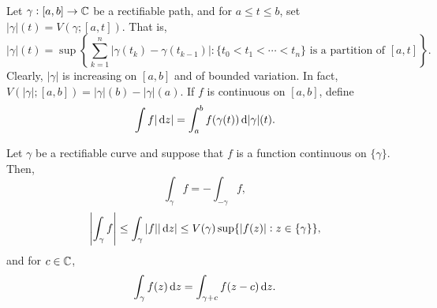 	\begin{definition}
		Let $\gamma : [a,b] \to \mathbb{C}$ be a rectifiable path, and for $a \le t \le b$, set $|\gamma|(t) = V(\gamma;[a,t])$. That is,
		\[ |\gamma|(t) = \sup\left\{ \sum_{k=1}^{n} |\gamma(t_k) - \gamma(t_{k-1})| : \{ t_0 < t_1 < \cdots < t_n \}\text{ is a partition of }[a,t] \right\}. \]
		Clearly, $|\gamma|$ is increasing on $[a,b]$ and of bounded variation. In fact, $V(|\gamma|;[a,b]) = |\gamma|(b) - |\gamma|(a)$. If $f$ is continuous on $[a,b]$, define
		\[ \int f |\dif z| = \int_a^b f(\gamma(t)) \dif |\gamma|(t). \]
	\end{definition}

	\begin{ftheo}
		Let $\gamma$ be a rectifiable curve and suppose that $f$ is a function continuous on $\{\gamma\}$. Then,
		\begin{equation}
			\label{eqn: 2.2}
			\int_\gamma f = - \int_{-\gamma} f,
		\end{equation}
		\begin{equation}
			\label{eqn: 2.3}
			\left| \int_\gamma f \right| \le \int_\gamma |f| |\dif z| \le V(\gamma) \sup\{ |f(z)| : z \in \{\gamma\} \},
		\end{equation}
		and for $c \in \mathbb{C}$,
		\begin{equation}
			\label{eqn: 2.4}
			\int_\gamma f(z) \dif z = \int_{\gamma + c} f(z-c) \dif z.
		\end{equation}
	\end{ftheo}
